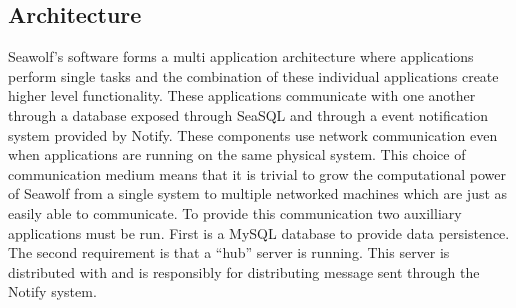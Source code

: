 \subsection{Architecture} \label{archarch}
Seawolf's software forms a multi application architecture where applications
perform single tasks and the combination of these individual applications create
higher level functionality. These applications communicate with one another
through a database exposed through SeaSQL and through a event notification
system provided by Notify. These components use network communication even when
applications are running on the same physical system. This choice of
communication medium means that it is trivial to grow the computational power of
Seawolf from a single system to multiple networked machines which are just as
easily able to communicate. To provide this communication two auxilliary
applications must be run. First is a MySQL database to provide data
persistence. The second requirement is that a ``hub'' server is running. This
server is distributed with \libseawolf{} and is responsibly for distributing
message sent through the Notify system.
